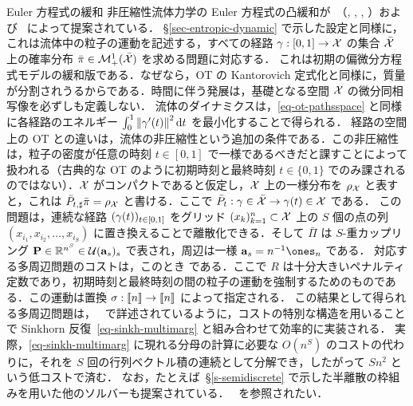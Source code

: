\begin{rem2}{Euler 方程式の緩和}
非圧縮性流体力学の Euler 方程式の凸緩和が~\citeauthor{BrenierGeneralized}（\citeyear{BrenierEulerAMS}, \citeyear{BrenierEulerARMA}, \citeyear{BrenierEulerCPAM}, \citeyear{BrenierGeneralized}）および~\citep{AmbrosioFigalliEuler} によって提案されている．
%
\S\ref{sec-entropic-dynamic} で示した設定と同様に，これは流体中の粒子の運動を記述する，すべての経路 $\gamma : [0,1] \rightarrow \mathcal{X}$ の集合 $\bar{\mathcal{X}}$ 上の確率分布 $\bar\pi \in \mathcal{M}_+^1(\bar{\mathcal{X}})$ を求める問題に対応する．
%
これは初期の偏微分方程式モデルの緩和版である．なぜなら，OT の Kantorovich 定式化と同様に，質量が分割されうるからである．時間に伴う発展は，基礎となる空間 $\mathcal{X}$ の微分同相写像を必ずしも定義しない．
%
流体のダイナミクスは，\eqref{eq-ot-pathsspace} と同様に各経路のエネルギー $\int_0^1 \left\| \gamma'(t) \right\|^2 \mathrm{d} t$ を最小化することで得られる．
%
経路の空間上の OT との違いは，流体の非圧縮性という追加の条件である．この非圧縮性は，粒子の密度が任意の時刻 $t \in [0,1]$ で一様であるべきだと課すことによって扱われる（古典的な OT のように初期時刻と最終時刻 $t \in \{0,1\}$ でのみ課されるのではない）．$\mathcal{X}$ がコンパクトであると仮定し，$\mathcal{X}$ 上の一様分布を $\rho_{\mathcal{X}}$ と表すと，これは $\bar P_{t,\sharp} \bar\pi = \rho_{\mathcal{X}}$ と書ける．ここで $\bar P_t : \gamma \in \bar{\mathcal{X}} \rightarrow \gamma(t) \in \mathcal{X}$ である．
%
この問題は，連続な経路 $(\gamma(t))_{t \in [0,1]}$ をグリッド $(x_k)_{k=1}^n \subset \mathcal{X}$ 上の $S$ 個の点の列 $(x_{i_1}, x_{i_2},\ldots,x_{i_S})$ に置き換えることで離散化できる．そして $\bar\Pi$ は $S$-重カップリング $\mathrm{\textbf{P}} \in \mathbb{R}^{n^S} \in \mathcal{U}(\mathrm{\textbf{a}}_s)_s$ で表され，周辺は一様 $\a_s=n^{-1} \ones_n$ である．
%
対応する多周辺問題のコストは，このとき
である．ここで $R$ は十分大きいペナルティ定数であり，初期時刻と最終時刻の間の粒子の運動を強制するためのものである．この運動は置換 $\sigma : \llbracket n\rrbracket \rightarrow \llbracket n\rrbracket$ によって指定される．
%
この結果として得られる多周辺問題は，~\citep{2015-benamou-cisc} で詳述されているように，コストの特別な構造を用いることで Sinkhorn 反復~\eqref{eq-sinkh-multimarg} と組み合わせて効率的に実装される．
%
実際，\eqref{eq-sinkh-multimarg} に現れる分母の計算に必要な $O(n^S)$ のコストの代わりに，それを $S$ 回の行列ベクトル積の連続として分解でき，したがって $Sn^2$ という低コストで済む．
%
なお，たとえば~\S\ref{s-semidiscrete} で示した半離散の枠組みを用いた他のソルバーも提案されている．~\citep{deGoes2015,gallouet2017lagrangian} を参照されたい．
\end{rem2}


